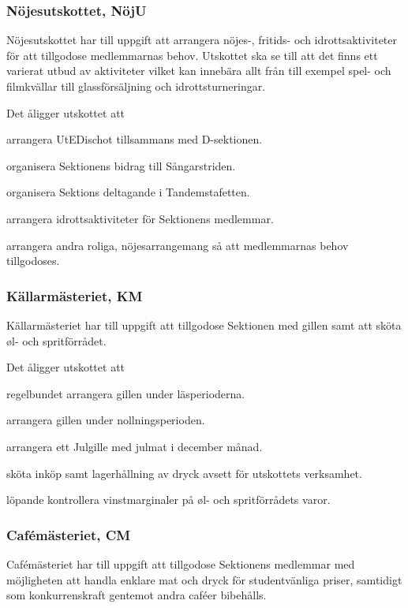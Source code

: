 \documentclass[10pt]{article}
\begin{document}
\subsubsection{Nöjesutskottet, NöjU}
Nöjesutskottet har till uppgift att arrangera nöjes-, fritids- och idrottsaktiviteter för att tillgodose medlemmarnas behov. Utskottet ska se till att det finns ett varierat utbud av aktiviteter vilket kan innebära allt från till exempel spel- och filmkvällar till glassförsäljning och idrottsturneringar.

Det åligger utskottet att
\begin{tightdashlist}
\item arrangera UtEDischot tillsammans med D-sektionen.
\item organisera Sektionens bidrag till Sångarstriden.
\item organisera Sektions deltagande i Tandemstafetten.
\item arrangera idrottsaktiviteter för Sektionens medlemmar.
\item arrangera andra roliga, nöjesarrangemang så att medlemmarnas behov tillgodoses.
\end{tightdashlist}

\subsubsection{Källarmästeriet, KM}
Källarmästeriet har till uppgift att tillgodose Sektionen med gillen samt att sköta øl- och spritförrådet.

Det åligger utskottet att
\begin{tightdashlist}
\item regelbundet arrangera gillen under läsperioderna.
\item arrangera gillen under nollningsperioden.
\item arrangera ett Julgille med julmat i december månad.
\item sköta inköp samt lagerhållning av dryck avsett för utskottets verksamhet.
\item löpande kontrollera vinstmarginaler på øl- och spritförrådets varor.
\end{tightdashlist}

\subsubsection{Cafémästeriet, CM}
Cafémästeriet har till uppgift att tillgodose Sektionens medlemmar med möjligheten att handla enklare mat och dryck för studentvänliga priser, samtidigt som konkurrenskraft gentemot andra caféer bibehålls.
\end{document}
